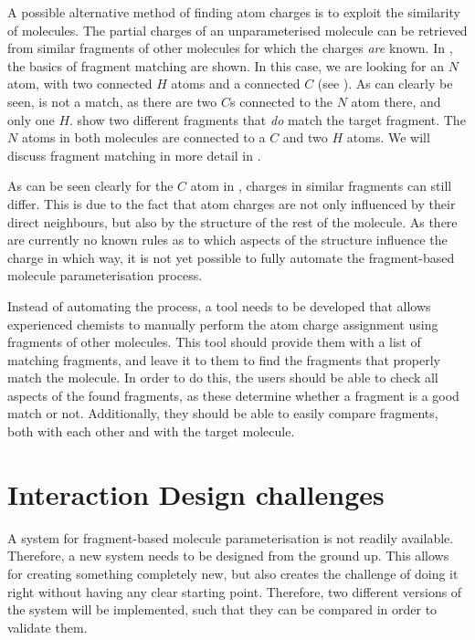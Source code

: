 A possible alternative method of finding atom charges is to exploit the similarity of molecules. The partial charges of an unparameterised molecule can be retrieved from similar fragments of other molecules for which the charges \emph{are} known. In , the basics of fragment matching are shown. In this case, we are looking for an $N$ atom, with two connected $H$ atoms and a connected $C$ (see ). As can clearly be seen,  is not a match, as there are two $C$s connected to the $N$ atom there, and only one $H$.  show two different fragments that \emph{do} match the target fragment. The $N$ atoms in both molecules are connected to a $C$ and two $H$ atoms. We will discuss fragment matching in more detail in .

As can be seen clearly for the $C$ atom in , charges in similar fragments can still differ. This is due to the fact that atom charges are not only influenced by their direct neighbours, but also by the structure of the rest of the molecule. As there are currently no known rules as to which aspects of the structure influence the charge in which way, it is not yet possible to fully automate the fragment-based molecule parameterisation process.

Instead of automating the process, a tool needs to be developed that allows experienced chemists to manually perform the atom charge assignment using fragments of other molecules. This tool should provide them with a list of matching fragments, and leave it to them to find the fragments that properly match the molecule. In order to do this, the users should be able to check all aspects of the found fragments, as these determine whether a fragment is a good match or not. Additionally, they should be able to easily compare fragments, both with each other and with the target molecule.



\section{Interaction Design challenges}
A system for fragment-based molecule parameterisation is not readily available. Therefore, a new system needs to be designed from the ground up. This allows for creating something completely new, but also creates the challenge of doing it right without having any clear starting point. Therefore, two different versions of the system will be implemented, such that they can be compared in order to validate them.

